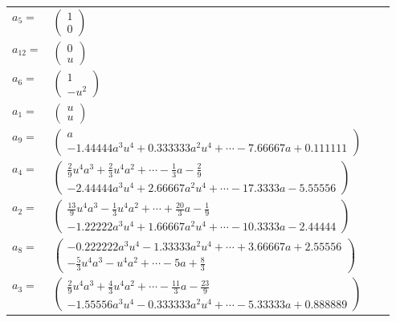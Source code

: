 \documentclass[1p]{elsarticle_modified}
\theoremstyle{definition}
\begin{document}
\begin{tabular}{m{7pt} m{180pt} m{7pt} m{180pt} }
\flushright $a_{5}=$&$\begin{pmatrix}1\\0\end{pmatrix}$ \\
\flushright $a_{12}=$&$\begin{pmatrix}0\\u\end{pmatrix}$ \\
\flushright $a_{6}=$&$\begin{pmatrix}1\\- u^2\end{pmatrix}$ \\
\flushright $a_{1}=$&$\begin{pmatrix}u\\u\end{pmatrix}$ \\
\flushright $a_{9}=$&$\begin{pmatrix}a\\-1.44444 a^{3} u^{4}+0.333333 a^{2} u^{4}+\cdots-7.66667 a+0.111111\end{pmatrix}$ \\
\flushright $a_{4}=$&$\begin{pmatrix}\frac{2}{9} u^4 a^3+\frac{2}{3} u^4 a^2+\cdots-\frac{1}{3} a-\frac{2}{9}\\-2.44444 a^{3} u^{4}+2.66667 a^{2} u^{4}+\cdots-17.3333 a-5.55556\end{pmatrix}$ \\
\flushright $a_{2}=$&$\begin{pmatrix}\frac{13}{9} u^4 a^3-\frac{1}{3} u^4 a^2+\cdots+\frac{20}{3} a-\frac{1}{9}\\-1.22222 a^{3} u^{4}+1.66667 a^{2} u^{4}+\cdots-10.3333 a-2.44444\end{pmatrix}$ \\
\flushright $a_{8}=$&$\begin{pmatrix}-0.222222 a^{3} u^{4}-1.33333 a^{2} u^{4}+\cdots+3.66667 a+2.55556\\-\frac{5}{3} u^4 a^3- u^4 a^2+\cdots-5 a+\frac{8}{3}\end{pmatrix}$ \\
\flushright $a_{3}=$&$\begin{pmatrix}\frac{2}{9} u^4 a^3+\frac{4}{3} u^4 a^2+\cdots-\frac{11}{3} a-\frac{23}{9}\\-1.55556 a^{3} u^{4}-0.333333 a^{2} u^{4}+\cdots-5.33333 a+0.888889\end{pmatrix}$ \\

\end{tabular}
\end{document}
